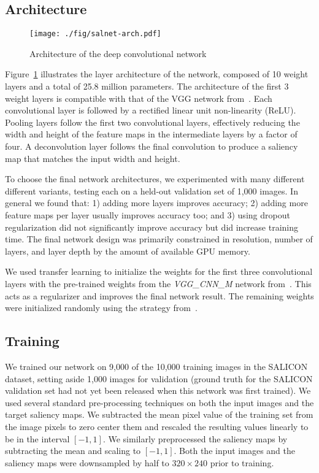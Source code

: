 \documentclass[10pt,twocolumn,letterpaper]{article}
\begin{document}
\subsection{Architecture}\begin{figure}
	\centering
	\texttt{[image: ./fig/salnet-arch.pdf]}
	\caption{Architecture of the deep convolutional network}
	\label{fig:salnet-arch}
\end{figure}

Figure~\ref{fig:salnet-arch} illustrates the layer architecture of the network, composed of 10 weight layers and a total of 25.8 million parameters.
The architecture of the first 3 weight layers is compatible with that of the VGG network from~\cite{chatfield2014devil}. Each convolutional layer is followed by a rectified linear unit non-linearity (ReLU). Pooling layers follow the first two convolutional layers, effectively reducing the width and height of the feature maps in the intermediate layers by a factor of four. A deconvolution layer follows the final convolution to produce a saliency map that matches the input width and height.



To choose the final network architectures, we experimented with many different different variants, testing each on a held-out validation set of 1,000 images. In general we found that: 1) adding more layers improves accuracy; 2) adding more feature maps per layer usually improves accuracy too; and 3) using dropout regularization did not significantly improve accuracy but did increase training time. The final network design was primarily constrained in resolution, number of layers, and layer depth by the amount of available GPU memory.

We used transfer learning to initialize the weights for the first three convolutional layers with the pre-trained weights from the \emph{VGG\_CNN\_M} network from~\cite{chatfield2014devil}. This acts as a regularizer and improves the final network result. The remaining weights were initialized randomly using the strategy from~\cite{he2015rectifiers}. 

\subsection{Training}

We trained our network on 9,000 of the 10,000 training images in the SALICON dataset, setting aside 1,000 images for validation (ground truth for the SALICON validation set had not yet been released when this network was first trained). We used several standard pre-processing techniques on both the input images and the target saliency maps. We subtracted the mean pixel value of the training set from the image pixels to zero center them and rescaled the resulting values linearly to be in the interval $[-1,1]$. We similarly preprocessed the saliency maps by subtracting the mean and scaling to $[-1,1]$. Both the input images and the saliency maps were downsampled by half to $320 \times 240$ prior to training.
\end{document}
